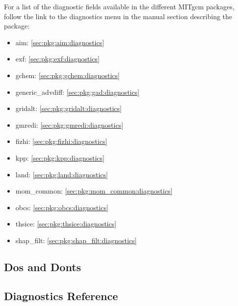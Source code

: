 

\newpage
\noindent For a list of the diagnostic fields available in the
different MITgcm packages, follow the link to the diagnostics menu
in the manual section describing the package:

\begin{itemize}
\item aim: \ref{sec:pkg:aim:diagnostics}
\item exf: \ref{sec:pkg:exf:diagnostics}
\item gchem: \ref{sec:pkg:gchem:diagnostics}
\item generic\_advdiff: \ref{sec:pkg:gad:diagnostics}
\item gridalt: \ref{sec:pkg:gridalt:diagnostics}
\item gmredi: \ref{sec:pkg:gmredi:diagnostics}
\item fizhi: \ref{sec:pkg:fizhi:diagnostics}
\item kpp: \ref{sec:pkg:kpp:diagnostics}
\item land: \ref{sec:pkg:land:diagnostics}
\item mom\_common: \ref{sec:pkg:mom_common:diagnostics}
\item obcs: \ref{sec:pkg:obcs:diagnostics}
\item thsice: \ref{sec:pkg:thsice:diagnostics}
\item shap\_filt: \ref{sec:pkg:shap_filt:diagnostics}
\end{itemize}

\subsection{Dos and Donts}

\subsection{Diagnostics Reference}

